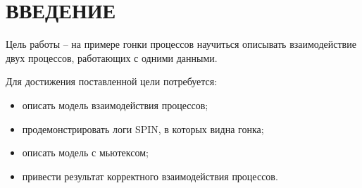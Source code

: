 \section*{ВВЕДЕНИЕ}

Цель работы -- на примере гонки процессов научиться описывать взаимодействие двух процессов, работающих с одними данными.

Для достижения поставленной цели потребуется:
\begin{itemize}
	\item описать модель взаимодействия процессов;
	\item продемонстрировать логи SPIN, в которых видна гонка;
	\item описать модель с мьютексом;
	\item привести результат корректного взаимодействия процессов.
\end{itemize}

\pagebreak